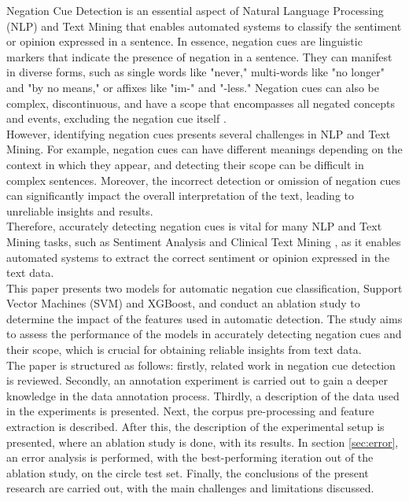 Negation Cue Detection is an essential aspect of Natural Language Processing (NLP) and Text Mining that enables automated systems to classify the sentiment or opinion expressed in a sentence. In essence, negation cues are linguistic markers that indicate the presence of negation in a sentence. They can manifest in diverse forms, such as single words like "never," multi-words like "no longer" and "by no means," or affixes like "im-" and "-less." Negation cues can also be complex, discontinuous, and have a scope that encompasses all negated concepts and events, excluding the negation cue itself \cite{jbara-2012}. 
\\

However, identifying negation cues presents several challenges in NLP and Text Mining. For example, negation cues can have different meanings depending on the context in which they appear, and detecting their scope can be difficult in complex sentences. Moreover, the incorrect detection or omission of negation cues can significantly impact the overall interpretation of the text, leading to unreliable insights and results.
\\

Therefore, accurately detecting negation cues is vital for many NLP and Text Mining tasks, such as Sentiment Analysis \cite{cruz2016machine} and Clinical Text Mining \cite{mehrabi2015deepen}, as it enables automated systems to extract the correct sentiment or opinion expressed in the text data. 
\\

This paper presents two models for automatic negation cue classification,  Support Vector Machines (SVM) and XGBoost, and conduct an ablation study to determine the impact of the features used in automatic detection. The study aims to assess the performance of the models in accurately detecting negation cues and their scope, which is crucial for obtaining reliable insights from text data.
\\

 The paper is structured as follows: firstly, related work in negation cue detection is reviewed. Secondly, an annotation experiment is carried out to gain a deeper knowledge in the data annotation process. Thirdly, a description of the data used in the experiments is presented. Next, the corpus pre-processing and feature extraction is described. After this, the description of the experimental setup is presented, where an ablation study is done, with its results. In section \ref{sec:error}, an error analysis is performed, with the best-performing iteration out of the ablation study, on the circle test set. Finally, the conclusions of the present research are carried out, with the main challenges and limitations discussed.

